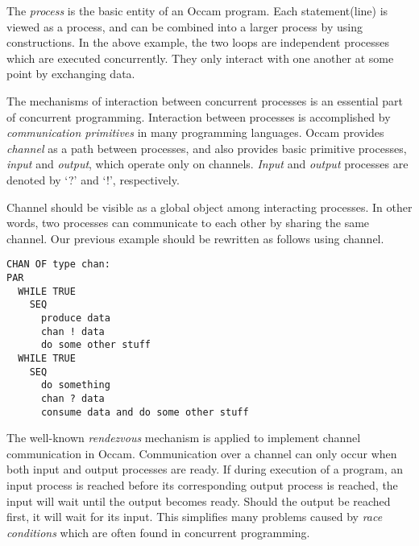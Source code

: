 \par
The {\em process} is the basic entity of an Occam program.
Each statement(line) is viewed as a process, and can be combined into a
larger process by using constructions.  In the above example, the two
loops are independent processes which are executed concurrently. They only
interact with one another at some point by exchanging data.

The mechanisms of interaction between concurrent processes is an essential
part of concurrent programming.  Interaction between processes is
accomplished by {\em communication primitives} in many programming languages.
Occam provides {\em channel} as a path
between processes, and also provides basic primitive processes, {\em
input} and {\em output}, which operate only on channels.
{\em Input} and {\em output} processes are denoted by `?' and `!', 
respectively.  

Channel should be visible as a global object among interacting processes.
In other words, two processes can communicate to each other by sharing
the same channel.  Our previous example should be rewritten as follows
using channel.
\begin{lin}
\begin{verbatim}
CHAN OF type chan:
PAR
  WHILE TRUE
    SEQ
      produce data
      chan ! data
      do some other stuff
  WHILE TRUE
    SEQ 
      do something
      chan ? data
      consume data and do some other stuff
\end{verbatim}
\end{lin}

\par
The well-known {\em rendezvous} mechanism is applied to implement 
channel communication in Occam.  Communication over a channel can only
occur when both input and output processes are ready. If during
execution of a program, an input process is reached before its
corresponding output process is reached, the input will wait until
the output becomes ready. Should the output be reached first, it will
wait for its input.
This simplifies many problems caused by {\em race conditions}
which are often found in concurrent programming.  


